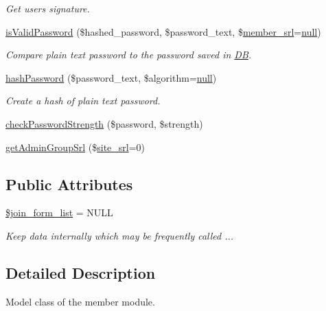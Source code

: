 \begin{DoxyCompactItemize}
\begin{DoxyCompactList}\small\item\em Get user\textquotesingle{}s signature. \end{DoxyCompactList}\item 
\hyperlink{classmemberModel_a5d2727323d47e4304998311424bb4091}{is\+Valid\+Password} (\$hashed\+\_\+password, \$password\+\_\+text, \$\hyperlink{ko_8install_8php_aa61f9e08f0fe505094d26f8143f30bbd}{member\+\_\+srl}=\hyperlink{modernizr_8min_8js_a286f9ec831c5e676eeb493248eab9575}{null})
\begin{DoxyCompactList}\small\item\em Compare plain text password to the password saved in \hyperlink{classDB}{DB}. \end{DoxyCompactList}\item 
\hyperlink{classmemberModel_a0183c4c53c2eadc045ba27d82b94412a}{hash\+Password} (\$password\+\_\+text, \$algorithm=\hyperlink{modernizr_8min_8js_a286f9ec831c5e676eeb493248eab9575}{null})
\begin{DoxyCompactList}\small\item\em Create a hash of plain text password. \end{DoxyCompactList}\item 
\hyperlink{classmemberModel_a5970b2dcba76f9fc910cc3df7de19ac7}{check\+Password\+Strength} (\$password, \$strength)
\item 
\hyperlink{classmemberModel_ad8c1aafe9a4f461404b596ff6ad3e2ed}{get\+Admin\+Group\+Srl} (\$\hyperlink{ko_8install_8php_a8b1406b4ad1048041558dce6bfe89004}{site\+\_\+srl}=0)
\end{DoxyCompactItemize}
\subsection*{Public Attributes}
\begin{DoxyCompactItemize}
\item 
\hyperlink{classmemberModel_aa9b942e17ed74955c8700dd74d75d2b2}{\$join\+\_\+form\+\_\+list} = N\+U\+LL
\begin{DoxyCompactList}\small\item\em Keep data internally which may be frequently called ... \end{DoxyCompactList}\end{DoxyCompactItemize}


\subsection{Detailed Description}
Model class of the member module. 

